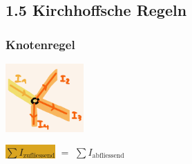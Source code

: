 \subsection*{1.5 Kirchhoffsche Regeln}
    \subsubsection*{Knotenregel}
    \vspace{-1mm}
    \begin{minipage}{0.49\linewidth}
        \begin{footnotesize}
            \begin{center}
                \vspace{2mm}
                \includegraphics[width = 30mm]{src/images/knotenregel.png}
            \end{center}
        \end{footnotesize}
    \end{minipage}
    \begin{minipage}{0.5\linewidth}
        \begin{scriptsize}
            \begin{center}
            \end{center}
        \end{scriptsize}
    \end{minipage}
    \vspace{1mm}
    \hfill \colorbox{Goldenrod}{$\sum I_\text{zufliessend}$} $=$ \colorbox{Apricot}{$\sum I_\text{abfliessend}$} 


